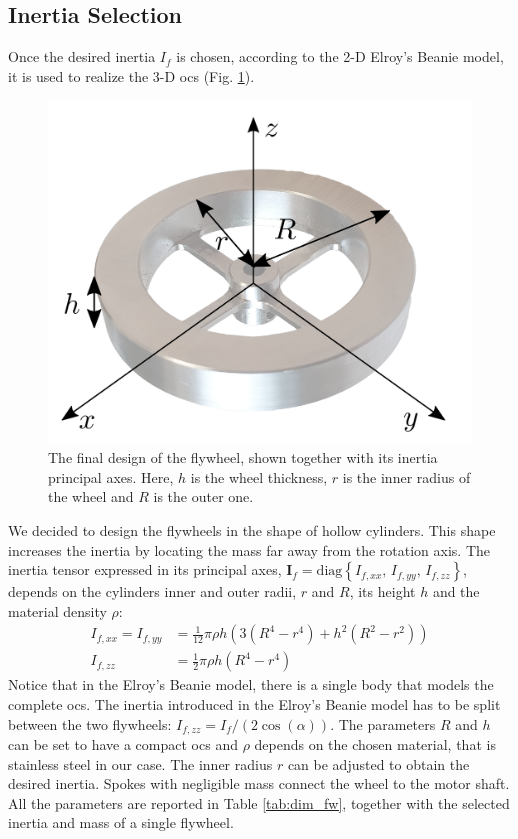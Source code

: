 \documentclass[letterpaper, 10 pt, conference]{ieeeconf}      %
\begin{document}
\subsection{Inertia Selection}
Once the desired inertia $I_f$ is chosen, according to the 2-D Elroy's Beanie model, it is used to realize the 3-D \gls{ocs} (Fig. \ref{fig:flywheel}). 
\begin{figure}
	\centering
	\includegraphics[width=0.7\linewidth]{figures/flywheel_opaque.png}
	\caption{\small The final design of the flywheel, shown together with its inertia principal axes. Here, $h$ is the wheel thickness, $r$ is the inner radius of the wheel and $R$ is the outer one.}
	\label{fig:flywheel}
\end{figure}
We decided to design the flywheels in the shape of hollow cylinders. This shape increases the inertia by locating the mass far away from the rotation axis. The inertia tensor expressed in its principal axes, $\bm{I}_f = \mathrm{diag}\left\{ I_{f, xx}, \, I_{f, yy}, \, I_{f, zz}  \right\}$, depends on the cylinders inner and outer radii, $r$ and $R$, its height $h$ and the material density $\rho$:
\begin{equation}
\begin{split}
I_{f, xx} = I_{f, yy} &= \frac{1}{12}\pi \rho h \left(3\left(R^4 - r^4\right) + h^2\left(R^2 - r^2\right)\right) \\
I_{f, zz} &= \frac{1}{2}\pi \rho h \left(R^4 - r^4\right)
\end{split}
\end{equation}
Notice that in the Elroy's Beanie model, there is a single body that models the complete \gls{ocs}. The inertia introduced in the Elroy's Beanie model has to be split between the two flywheels: $I_{f, zz} = I_f/\left(2\cos(\alpha)\right)$. 
The parameters $R$ and $h$ can be set to have a compact \gls{ocs} and $\rho$ depends on the chosen material, that is stainless steel in our case. The inner radius $r$ can be adjusted to obtain the desired inertia. Spokes with negligible mass connect the wheel to the motor shaft. All the parameters are reported in Table \ref{tab:dim_fw}, together with the selected inertia and mass of a single flywheel.
\end{document}
